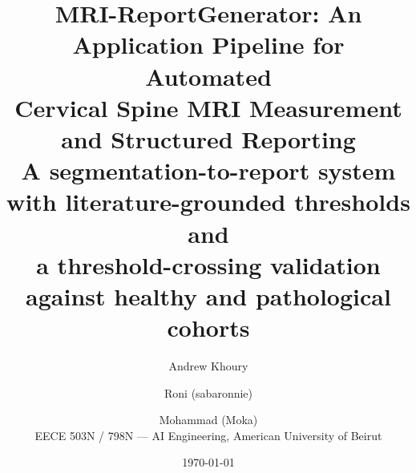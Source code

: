 \documentclass[11pt,a4paper]{article}
\title{\textbf{MRI-ReportGenerator: An Application Pipeline for Automated\\
Cervical Spine MRI Measurement and Structured Reporting}\\[4pt]
\large A segmentation-to-report system with literature-grounded thresholds and\\
a threshold-crossing validation against healthy and pathological cohorts}
\author{Andrew Khoury \and Roni (sabaronnie) \and Mohammad (Moka)\\
\small EECE 503N / 798N --- AI Engineering, American University of Beirut}
\date{\today}
\begin{document}
\maketitle
\thispagestyle{fancy}

\begin{abstract}

\end{abstract}

\tableofcontents
\newpage




















\appendix






\end{document}
